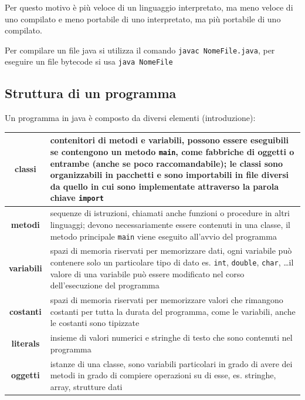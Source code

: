 \documentclass{article}
\begin{document}
Per questo motivo è più veloce di un linguaggio interpretato, ma meno veloce di uno compilato e meno portabile di uno
interpretato, ma più portabile di uno compilato.

Per compilare un file java si utilizza il comando \verb|javac NomeFile.java|, per eseguire un file bytecode si usa
\verb|java NomeFile|


\subsection{Struttura di un programma}
Un programma in java è composto da diversi elementi (introduzione):
\begin{center}
	\begin{tabularx}{\textwidth}{c X}
		\textbf{classi}
		& contenitori di metodi e variabili, possono essere eseguibili se contengono un metodo \verb|main|, come fabbriche
		di oggetti o entrambe (anche se poco raccomandabile); le classi sono organizzabili in pacchetti e sono importabili
		in file diversi da quello in cui sono implementate attraverso la parola chiave \verb|import| \\
		\midrule
		
		\textbf{metodi}
		& sequenze di istruzioni, chiamati anche funzioni o procedure in altri linguaggi; devono necessariamente essere
		contenuti in una classe, il metodo principale \verb|main| viene eseguito all'avvio del programma \\
		\midrule

		\textbf{variabili}
		& spazi di memoria riservati per memorizzare dati, ogni variabile può contenere solo un particolare tipo di dato
		es. \verb|int|, \verb|double|, \verb|char|, \dots il valore di una variabile può essere modificato nel corso
		dell'esecuzione del programma \\
		\midrule
		
		\textbf{costanti}
		& spazi di memoria riservati per memorizzare valori che rimangono costanti per tutta la durata del programma,
		come le variabili, anche le costanti sono tipizzate \\
		\midrule
		
		\textbf{literals}
		& insieme di valori numerici e stringhe di testo che sono contenuti nel programma \\
		\midrule
		
		\textbf{oggetti}
		& istanze di una classe, sono variabili particolari in grado di avere dei metodi in grado di compiere operazioni
		su di esse, es. stringhe, array, strutture dati \\
		\midrule
		

\end{tabularx}
\end{center}
\end{document}
